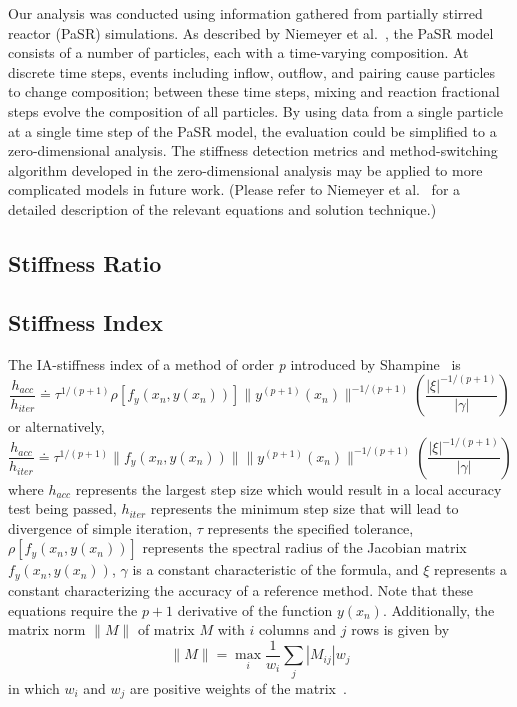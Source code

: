 \documentclass[12pt]{ussci}
\begin{document}

Our analysis was conducted using information gathered from partially stirred reactor (PaSR) simulations.
As described by Niemeyer et al.~\cite{Niemeyer:2017}, the PaSR model consists of a number of particles, each with a time-varying composition.
At discrete time steps, events including inflow, outflow, and pairing cause particles to change composition; between these time steps, mixing and reaction fractional steps evolve the composition of all particles.
By using data from a single particle at a single time step of the PaSR model, the evaluation could be simplified to a zero-dimensional analysis.
The stiffness detection metrics and method-switching algorithm developed in the zero-dimensional analysis may be applied to more complicated models in future work.
(Please refer to Niemeyer et al.~\cite{Niemeyer:2017} for a detailed description of the relevant equations and solution technique.)

\subsection{Stiffness Ratio}


\subsection{Stiffness Index}

The IA-stiffness index of a method of order \textit{p} introduced by Shampine~\cite{Shampine1982} is
\begin{equation}
    \frac{h_{acc}}{h_{iter}} \doteq \tau ^ {1/(p + 1)} \rho [f_y(x_n,y(x_n))] \|y^{(p+1)}(x_n)\|^{-1/(p+1)} \left( \frac{|\xi|^{-1/(p+1)}}{|\gamma|} \right)
\end{equation}
or alternatively,
\begin{equation}
    \frac{h_{acc}}{h_{iter}} \doteq \tau ^ {1/(p + 1)} \|f_y(x_n,y(x_n))\|\|y^{(p+1)}(x_n)\|^{-1/(p+1)} \left( \frac{|\xi|^{-1/(p+1)}}{|\gamma|} \right)
\end{equation}
where $h_{acc}$ represents the largest step size which would result in a local accuracy test being passed, $h_{iter}$ represents the minimum step size that will lead to divergence of simple iteration, $\tau$ represents the specified tolerance, $\rho [f_y(x_n,y(x_n))]$ represents the spectral radius of the Jacobian matrix $f_y(x_n,y(x_n))$, $\gamma$ is a constant characteristic of the formula, and $\xi$ represents a constant characterizing the accuracy of a reference method.
Note that these equations require the $p+1$ derivative of the function $y(x_n)$.
Additionally, the matrix norm $\|M\|$ of matrix $M$ with $i$ columns and $j$ rows is given by
\begin{equation}
    \|M\| = \max_{i} \frac{1}{w_i} \sum_{j} |M_{ij}|w_j
\end{equation}
in which \(w_i\) and \(w_j\) are positive weights of the matrix~\cite{Shampine1985}.
\end{document}
